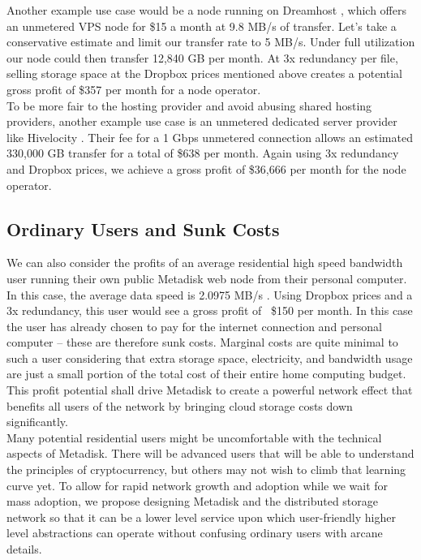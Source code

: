 \documentclass[a4paper,10pt]{article}
\begin{document}
Another example use case would be a node running on Dreamhost \cite{9}, which offers an unmetered VPS node for \$15 a month at 9.8 MB/s of transfer. Let’s take a conservative estimate and limit our transfer rate to 5 MB/s. Under full utilization our node could then transfer 12,840 GB per month. At 3x redundancy per file, selling storage space at the Dropbox prices mentioned above creates a potential gross profit of \$357 per month for a node operator. \\

To be more fair to the hosting provider and avoid abusing shared hosting providers, another example use case is an unmetered dedicated server provider like Hivelocity \cite{10}.  Their fee for a 1 Gbps unmetered connection allows an estimated 330,000 GB transfer for a total of \$638 per month. Again using 3x redundancy and Dropbox prices, we achieve a gross profit of \$36,666 per month for the node operator. 

\subsection{Ordinary Users and Sunk Costs}

We can also consider the profits of an average residential high speed bandwidth user running their own public Metadisk web node from their personal computer. In this case, the average data speed is 2.0975 MB/s \cite{11}. Using Dropbox prices and a 3x redundancy, this user would see a gross profit of ~\$150 per month. In this case the user has already chosen to pay for the internet connection and personal computer -- these are therefore sunk costs. Marginal costs are quite minimal to such a user considering that extra storage space, electricity, and bandwidth usage are just a small portion of the total cost of their entire home computing budget.  This profit potential shall drive Metadisk to create a powerful network effect that benefits all users of the network by bringing cloud storage costs down significantly.\\
 
Many potential residential users might be uncomfortable with the technical aspects of  Metadisk. There will be advanced users that will be able to understand the principles of cryptocurrency, but others may not wish to climb that learning curve yet.  To allow for rapid network growth and adoption while we wait for mass adoption, we propose designing Metadisk and the distributed storage network so that it can be a lower level service upon which user-friendly higher level abstractions can operate without confusing ordinary users with arcane details.\\
\end{document}
